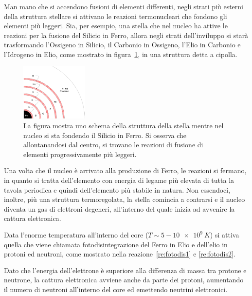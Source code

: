 Man mano che si accendono fusioni di elementi differenti, negli strati più esterni della struttura stellare si attivano le reazioni termonucleari che fondono gli elementi più leggeri. Sia, per esempio, una stella che nel nucleo ha attive le reazioni per la fusione del Silicio in Ferro, allora negli strati dell'inviluppo si starà trasformando l'Ossigeno in Silicio, il Carbonio in Ossigeno, l'Elio in Carbonio e l'Idrogeno in Elio, come mostrato in figura~\ref{fig:onion}, in una struttura detta a cipolla.

\begin{figure}
    \centering
    \includegraphics[width = 0.3\textwidth]{immagini/onion.png}
    \caption{La figura mostra uno schema della struttura della stella mentre nel nucleo si sta fondendo il Silicio in Ferro. Si osserva che allontanandosi dal centro, si trovano le reazioni di fusione di elementi progressivamente più leggeri.}\label{fig:onion}
\end{figure}

Una volta che il nucleo è arrivato alla produzione di Ferro, le reazioni si fermano, in quanto si tratta dell'elemento con energia di legame più elevata di tutta la tavola periodica e quindi dell'elemento più stabile in natura. Non essendoci, inoltre, più una struttura termoregolata, la stella comincia a contrarsi e il nucleo diventa un gas di elettroni degeneri, all'interno del quale inizia ad avvenire la cattura elettronica. 


Data l'enorme temperatura all'interno del core ($T \sim 5-\SI{10e9}{K}$) si attiva quella che viene chiamata fotodisintegrazione del Ferro in Elio e dell'elio in protoni ed neutroni, come mostrato nella reazione~\ref{re:fotodis1} e  \ref{re:fotodis2}.


Dato che l'energia dell'elettrone è superiore alla differenza di massa tra protone e neutrone, la cattura elettronica avviene anche da parte dei protoni, aumentando il numero di neutroni all'interno del core ed emettendo neutrini elettronici.

